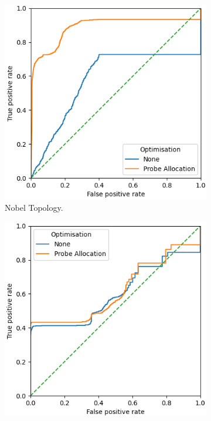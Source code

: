 \noindent
\begin{figure}
    \centering
    \begin{subfigure}{0.475\textwidth}
        \includegraphics[width=\textwidth]{figs/results/nobel-germany_ac3_opt.png}
        \caption{Nobel Topology.}
    \end{subfigure}
    \begin{subfigure}{0.475\textwidth}
        \includegraphics[width=\textwidth]{figs/results/france_ac3_opt.png}

\end{subfigure}
\end{figure}

